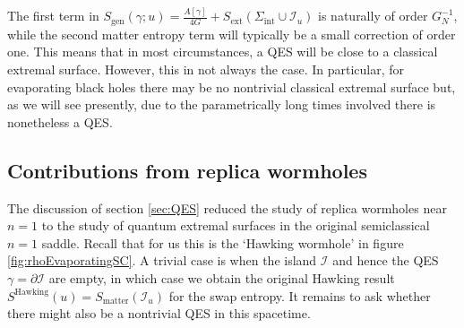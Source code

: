 \documentclass[letterpaper,12pt]{article}
\newcommand*{\scri}{\mathscr{I}} %
\newcommand*{\island}{\mathcal{I}}
\begin{document}
The first term in $S_\mathrm{gen}(\gamma;u)= \frac{A[\gamma]}{4G} + S_\mathrm{ext}(\Sigma_\mathrm{int}\cup \scri_u)$ is naturally of order $G_N^{-1}$, while the second matter entropy term will typically be a small correction of order one. This means that in most circumstances, a QES will be close to a classical extremal surface. However, this in not always the case. In particular, for evaporating black holes there may be no nontrivial classical extremal surface  but, as we will see presently, due to the parametrically long times involved there is nonetheless a QES.


\subsection{Contributions from replica wormholes}
\label{sec:replicaCon}

The discussion of section \ref{sec:QES} reduced the study of replica wormholes near $n=1$ to the study of quantum extremal surfaces in the original semiclassical $n=1$ saddle.  Recall that  for us this is the `Hawking wormhole' in figure \ref{fig:rhoEvaporatingSC}. A trivial case is when the island $\island$ and hence the QES $\gamma=\partial\island$ are empty, in which case we obtain the original Hawking result $S^\mathrm{Hawking}(u) = S_\mathrm{matter}(\scri_u)$ for the swap entropy. It remains to ask whether there might also be a nontrivial QES in this spacetime.
\end{document}
